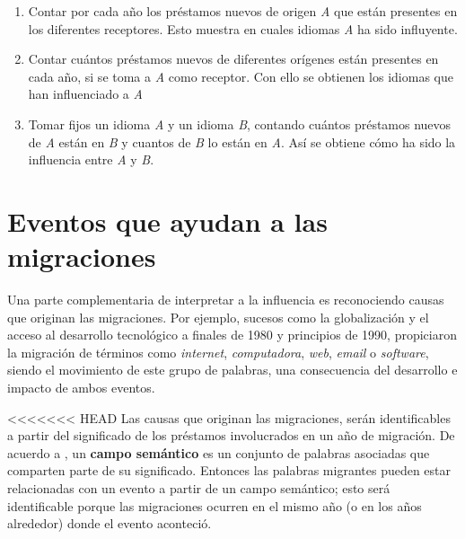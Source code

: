 \begin{enumerate}
	\label{proceso.nuevos}
	
\item Contar por cada año los préstamos nuevos de origen \textit{A} que están presentes en los diferentes receptores. Esto muestra en cuales idiomas \textit{A} ha sido influyente. 

\item Contar cuántos préstamos nuevos de diferentes orígenes están presentes en cada año, si se toma a \textit{A} como receptor. Con ello se obtienen los idiomas que han influenciado a \textit{A}




\item Tomar fijos un idioma \textit{A} y un idioma \textit{B}, contando cuántos préstamos nuevos de \textit{A} están en \textit{B} y cuantos de \textit{B} lo están en \textit{A}.  Así se obtiene cómo ha sido la influencia entre \textit{A} y \textit{B}.



\end{enumerate}


\section{Eventos que ayudan a las migraciones} %

Una parte complementaria de interpretar a la influencia es reconociendo causas
que originan las migraciones. Por ejemplo, sucesos como la globalización y el
acceso al desarrollo tecnológico a finales de 1980 y principios de 1990,
propiciaron la migración  de términos como \textit{internet},
\textit{computadora}, \textit{web}, \textit{email} o \textit{software}, siendo
el movimiento de este grupo de palabras, una consecuencia del desarrollo e
impacto de ambos eventos. 
 

<<<<<<< HEAD
Las causas que originan las migraciones, serán identificables a partir del significado de los préstamos involucrados en un año de migración. De acuerdo a \cite{mcgraw}, un  \textbf{campo semántico} es un conjunto de palabras asociadas que comparten parte de su significado. Entonces las palabras migrantes pueden estar relacionadas con un evento a partir de un campo semántico; esto será identificable porque las migraciones ocurren en el mismo año (o en los años alrededor) donde el evento aconteció. 






